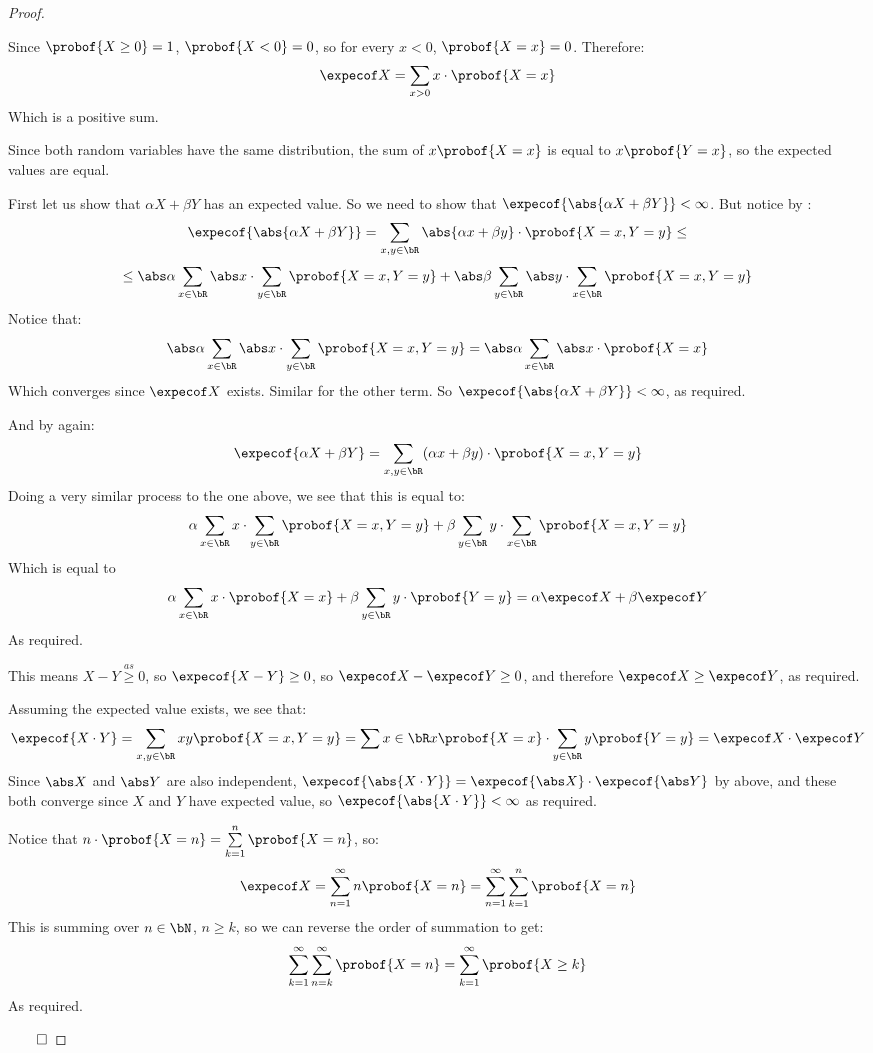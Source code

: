 \begin{proof}

	\begin{msecenumerate}[0pt]
		\mitem Since $\probof{X\geq0}=1$, $\probof{X<0}=0$, so for every $x<0$, $\probof{X=x}=0$.
		Therefore:
		\[ \expecof X = \sum_{x>0}x\cdot\probof{X=x} \]
		Which is a positive sum.

		\mitem Since both random variables have the same distribution, the sum of $x\probof{X=x}$ is equal
		to $x\probof{Y=x}$, so the expected values are equal.

		\mitem First let us show that $\alpha X+\beta Y$ has an expected value.
		So we need to show that $\expecof{\abs{\alpha X+\beta Y}}<\infty$.
		But notice by :
		\[ \expecof{\abs{\alpha X+\beta Y}} = \sum_{x,y\in\bR}\abs{\alpha x+\beta y}\cdot\probof{X=x,Y=y} \leq \]
		\[ \leq \abs\alpha\sum_{x\in\bR}\abs x\cdot\sum_{y\in\bR}\probof{X=x,Y=y} +
		\abs\beta\sum_{y\in\bR}\abs y\cdot\sum_{x\in\bR}\probof{X=x,Y=y} \]
		Notice that:
		\[ \abs\alpha\sum_{x\in\bR}\abs x\cdot\sum_{y\in\bR}\probof{X=x,Y=y} =
		\abs\alpha\sum_{x\in\bR}\abs x\cdot\probof{X=x} \]
		Which converges since $\expecof X$ exists.
		Similar for the other term.
		So $\expecof{\abs{\alpha X+\beta Y}}<\infty$, as required.

		And by  again:
		\[ \expecof{\alpha X+\beta Y} = \sum_{x,y\in\bR}(\alpha x+\beta y)\cdot\probof{X=x,Y=y} \]
		Doing a very similar process to the one above, we see that this is equal to:
		\[ \alpha\sum_{x\in\bR}x\cdot\sum_{y\in\bR}\probof{X=x,Y=y} +
		\beta\sum_{y\in\bR}y\cdot\sum_{x\in\bR}\probof{X=x,Y=y} \]
		Which is equal to
		\[ \alpha\sum_{x\in\bR}x\cdot\probof{X=x} + \beta\sum_{y\in\bR}y\cdot\probof{Y=y} = \alpha\expecof X+\beta\expecof Y \]
		As required.

		\mitem This means $X-Y\overset{as}\geq0$, so $\expecof{X-Y}\geq0$, so $\expecof X-\expecof Y\geq0$, and therefore
		$\expecof X\geq\expecof Y$, as required.

		\mitem Assuming the expected value exists, we see that:
		\[ \expecof{X\cdot Y} = \sum_{x,y\in\bR}xy\probof{X=x,Y=y} = \sum{x\in\bR}x\probof{X=x}\cdot\sum_{y\in\bR}y\probof{Y=y}
		= \expecof X\cdot\expecof Y \]
		Since $\abs X$ and $\abs Y$ are also independent, $\expecof{\abs{X\cdot Y}}=\expecof{\abs X}\cdot\expecof{\abs Y}$ by
		above, and these both converge since $X$ and $Y$ have expected value, so $\expecof{\abs{X\cdot Y}}<\infty$ as required.

		\mitem Notice that $n\cdot\probof{X=n} = \sum\limits_{k=1}^n\probof{X=n}$, so:
		\[ \expecof X = \sum_{n=1}^\infty n\probof{X=n} = \sum_{n=1}^\infty\sum_{k=1}^n\probof{X=n} \]
		This is summing over $n\in\bN$, $n\geq k$, so we can reverse the order of summation to get:
		\[ \sum_{k=1}^\infty\sum_{n=k}^\infty\probof{X=n} = \sum_{k=1}^\infty\probof{X\geq k} \]
		As required.
	\end{msecenumerate}

	\hfill$\qed$

\end{proof}

